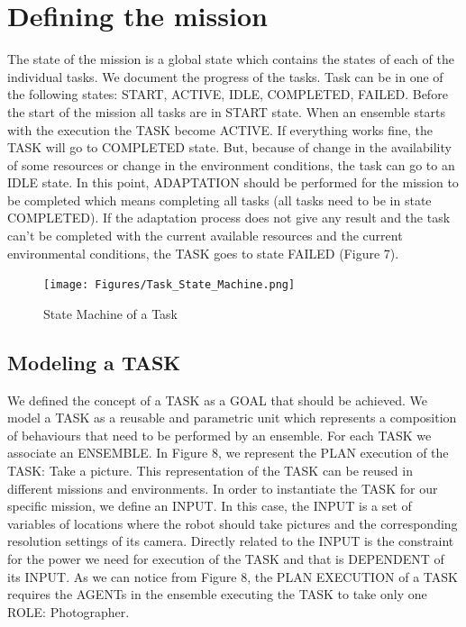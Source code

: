 \documentclass[journal]{IEEEtran}
\theoremstyle{definition}
\begin{document}
\section{Defining the mission}

The state of the mission is a global state which contains the states of each of the individual tasks. We document the progress of the tasks. Task can be in one of the following states: START, ACTIVE, IDLE, COMPLETED, FAILED.
Before the start of the mission all tasks are in START state. When an ensemble starts with the execution the TASK become ACTIVE. If everything works fine, the TASK will go to COMPLETED state.
But, because of change in the availability of some resources or change in the environment conditions, the task can go to an IDLE state. In this point, ADAPTATION should be performed for the mission to be completed which means completing all tasks (all tasks need to be in state COMPLETED). If the adaptation process does not give any result and the task can’t be completed with the current available resources and the current environmental conditions, the TASK  goes to state FAILED (Figure 7).

\begin{figure}[h]
\texttt{[image: Figures/Task\_State\_Machine.png]}
\caption{State Machine of a Task}
\end{figure}

\subsection{Modeling a TASK}
We defined the concept of a TASK as a GOAL that should be achieved. We model a TASK as a reusable  and parametric unit which represents a composition of behaviours that need to be performed by an ensemble. For each TASK we associate an ENSEMBLE.
In Figure 8, we represent the PLAN execution of the TASK: Take a picture. This representation of the TASK can be reused in different missions and environments. In order to instantiate the TASK for our specific mission, we define an INPUT. In this case, the INPUT is a set of variables of locations where the robot should take pictures and the corresponding resolution settings of its camera. Directly related to the INPUT is the constraint for the power we need for execution of the TASK and that is DEPENDENT of its INPUT. As we can notice from Figure 8, the PLAN EXECUTION of a TASK requires the AGENTs in the ensemble executing the TASK to take only one ROLE: Photographer.
\end{document}
